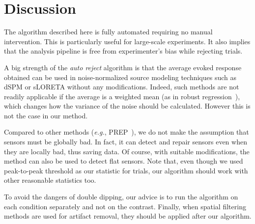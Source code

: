 \section{Discussion}
\label{sec:discussion}

The algorithm described here is fully automated requiring no manual intervention. This is particularly useful for large-scale experiments. It also implies that the analysis pipeline is free from experimenter's bias while rejecting trials.

A big strength of the \emph{auto reject} algorithm is that the average evoked response obtained can be used in noise-normalized source modeling techniques such as dSPM or sLORETA without any modifications. Indeed, such methods are not readily applicable if the average is a weighted mean (as in robust  regression~\citep{diedrichsen2005detecting}), which changes how the variance of the noise should be calculated. However this is not the case in our method.

\iftoggle{long}{Although the average signal has been used for optimizing the algorithm, it is not restricted to event-related potentials/fields. The algorithm is general and will work even with resting-state data. Instead of the average signal, one could also optimize at another analysis level -- source space, time-frequency signal \textit{etc} -- keeping in mind the dangers of double dipping \citep{kriegeskorte2009circular}.}{} 

Compared to other methods (\textit{e.g.}, PREP~\citep{bigdely2015prep}), we do not make the assumption that sensors must be globally bad. In fact, it can detect and repair sensors even when they are locally bad, thus saving data. Of course, with suitable modifications, the method can also be used to detect flat sensors. \iftoggle{long}{In the future, we will integrate this into the framework.}{} Note that, even though we used peak-to-peak threshold as our statistic for trials, our algorithm should work with other reasonable statistics too.

To avoid the dangers of double dipping, our advice is to run the algorithm on each condition separately and not on the contrast. \iftoggle{long}{The interpolation technology can pose some inherent limitations which we have partially addressed with the $\rho$ parameter.}{} Finally, when spatial filtering methods \citep{vigario1997extraction, uusitalo1997signal} are used for artifact removal, they should be applied after our algorithm.
